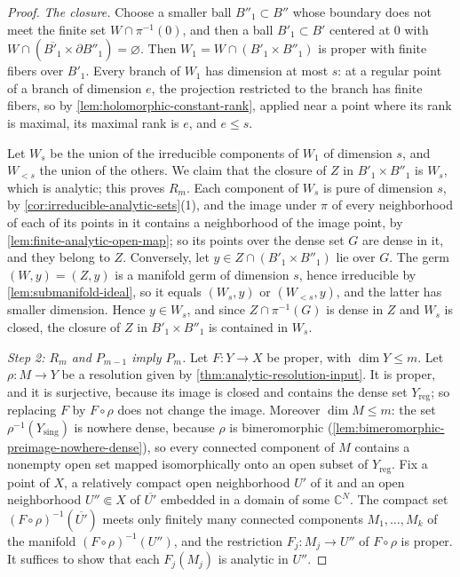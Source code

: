 \begin{proof}
\emph{The closure.} Choose a smaller ball $B''_1\subset B''$ whose boundary does not meet the finite set $W\cap\pi^{-1}(0)$, and then a ball $B'_1\subset B'$ centered at $0$ with $W\cap(\overline{B'_1}\times\partial B''_1)=\varnothing$. Then $W_1=W\cap(B'_1\times B''_1)$ is proper with finite fibers over $B'_1$. Every branch of $W_1$ has dimension at most $s$: at a regular point of a branch of dimension $e$, the projection restricted to the branch has finite fibers, so by \cref{lem:holomorphic-constant-rank}, applied near a point where its rank is maximal, its maximal rank is $e$, and $e\leq s$.

Let $W_s$ be the union of the irreducible components of $W_1$ of dimension $s$, and $W_{<s}$ the union of the others. We claim that the closure of $Z$ in $B'_1\times B''_1$ is $W_s$, which is analytic; this proves $R_m$. Each component of $W_s$ is pure of dimension $s$, by \cref{cor:irreducible-analytic-sets}(1), and the image under $\pi$ of every neighborhood of each of its points in it contains a neighborhood of the image point, by \cref{lem:finite-analytic-open-map}; so its points over the dense set $G$ are dense in it, and they belong to $Z$. Conversely, let $y\in Z\cap(B'_1\times B''_1)$ lie over $G$. The germ $(W,y)=(Z,y)$ is a manifold germ of dimension $s$, hence irreducible by \cref{lem:submanifold-ideal}, so it equals $(W_s,y)$ or $(W_{<s},y)$, and the latter has smaller dimension. Hence $y\in W_s$, and since $Z\cap\pi^{-1}(G)$ is dense in $Z$ and $W_s$ is closed, the closure of $Z$ in $B'_1\times B''_1$ is contained in $W_s$.

\emph{Step 2: $R_m$ and $P_{m-1}$ imply $P_m$.} Let $F\colon Y\to X$ be proper, with $\dim Y\leq m$. Let $\rho\colon M\to Y$ be a resolution given by \cref{thm:analytic-resolution-input}. It is proper, and it is surjective, because its image is closed and contains the dense set $Y_{\mathrm{reg}}$; so replacing $F$ by $F\circ\rho$ does not change the image. Moreover $\dim M\leq m$: the set $\rho^{-1}(Y_{\mathrm{sing}})$ is nowhere dense, because $\rho$ is bimeromorphic (\cref{lem:bimeromorphic-preimage-nowhere-dense}), so every connected component of $M$ contains a nonempty open set mapped isomorphically onto an open subset of $Y_{\mathrm{reg}}$. Fix a point of $X$, a relatively compact open neighborhood $U'$ of it and an open neighborhood $U''\Subset X$ of $\overline{U'}$ embedded in a domain of some $\mathbb C^N$. The compact set $(F\circ\rho)^{-1}(\overline{U'})$ meets only finitely many connected components $M_1,\ldots,M_k$ of the manifold $(F\circ\rho)^{-1}(U'')$, and the restriction $F_j\colon M_j\to U''$ of $F\circ\rho$ is proper. It suffices to show that each $F_j(M_j)$ is analytic in $U''$.


\end{proof}
